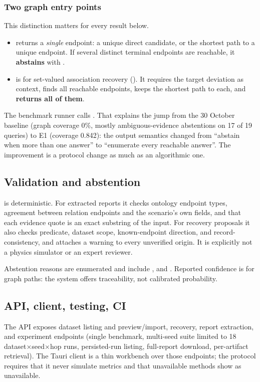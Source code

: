 \documentclass[10pt,twocolumn,a4paper]{extarticle}
\begin{document}
\subsubsection{Two graph entry points}
This distinction matters for every result below.
\begin{itemize}
  \item {} returns a \emph{single} endpoint: a unique direct candidate, or the shortest path to a unique endpoint. If several distinct terminal endpoints are reachable, it \textbf{abstains} with .
  \item {} is for set-valued association recovery (). It requires the target deviation as context, finds all reachable endpoints, keeps the shortest path to each, and \textbf{returns all of them}.
\end{itemize}
The benchmark runner calls . That explains the jump from the 30 October baseline (graph coverage 0\%, mostly ambiguous-evidence abstentions on 17 of 19 queries) to E1 (coverage 0.842): the output semantics changed from ``abstain when more than one answer'' to ``enumerate every reachable answer''. The improvement is a protocol change as much as an algorithmic one.

\subsection{Validation and abstention}
 is deterministic. For extracted reports it checks ontology endpoint types, agreement between relation endpoints and the scenario's own fields, and that each evidence quote is an exact substring of the input. For recovery proposals it also checks predicate, dataset scope, known-endpoint direction, and record-consistency, and attaches a  warning to every unverified origin. It is explicitly not a physics simulator or an expert reviewer.

Abstention reasons are enumerated and include ,  and . Reported confidence is  for graph paths: the system offers traceability, not calibrated probability.

\subsection{API, client, testing, CI}
The API exposes dataset listing and preview/import, recovery, report extraction, and experiment endpoints (single benchmark, multi-seed suite limited to 18 dataset$\times$seed$\times$hop runs, persisted-run listing, full-report download, per-artifact retrieval). The Tauri client is a thin workbench over those endpoints; the protocol requires that it never simulate metrics and that unavailable methods show as unavailable.
\end{document}
